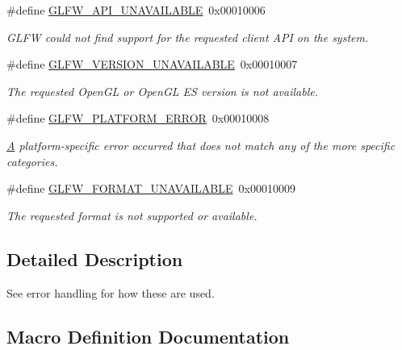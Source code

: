 \begin{DoxyCompactItemize}
\#define \hyperlink{group__errors_ga56882b290db23261cc6c053c40c2d08e}{G\+L\+F\+W\+\_\+\+A\+P\+I\+\_\+\+U\+N\+A\+V\+A\+I\+L\+A\+B\+L\+E}~0x00010006
\begin{DoxyCompactList}\small\item\em G\+L\+F\+W could not find support for the requested client A\+P\+I on the system. \end{DoxyCompactList}\item 
\#define \hyperlink{group__errors_gad16c5565b4a69f9c2a9ac2c0dbc89462}{G\+L\+F\+W\+\_\+\+V\+E\+R\+S\+I\+O\+N\+\_\+\+U\+N\+A\+V\+A\+I\+L\+A\+B\+L\+E}~0x00010007
\begin{DoxyCompactList}\small\item\em The requested Open\+G\+L or Open\+G\+L E\+S version is not available. \end{DoxyCompactList}\item 
\#define \hyperlink{group__errors_gad44162d78100ea5e87cdd38426b8c7a1}{G\+L\+F\+W\+\_\+\+P\+L\+A\+T\+F\+O\+R\+M\+\_\+\+E\+R\+R\+O\+R}~0x00010008
\begin{DoxyCompactList}\small\item\em \hyperlink{structA}{A} platform-\/specific error occurred that does not match any of the more specific categories. \end{DoxyCompactList}\item 
\#define \hyperlink{group__errors_ga196e125ef261d94184e2b55c05762f14}{G\+L\+F\+W\+\_\+\+F\+O\+R\+M\+A\+T\+\_\+\+U\+N\+A\+V\+A\+I\+L\+A\+B\+L\+E}~0x00010009
\begin{DoxyCompactList}\small\item\em The requested format is not supported or available. \end{DoxyCompactList}\end{DoxyCompactItemize}


\subsection{Detailed Description}
See error handling for how these are used. 

\subsection{Macro Definition Documentation}
\hypertarget{group__errors_ga56882b290db23261cc6c053c40c2d08e}{}
